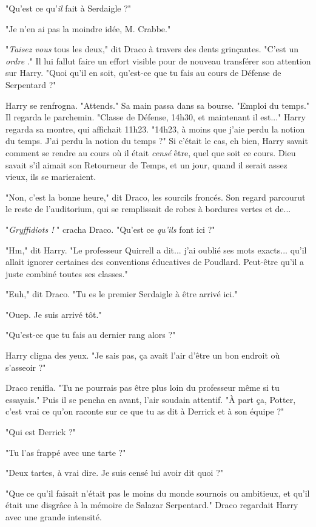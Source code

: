 "Qu'est ce qu'\emph{il}  fait à Serdaigle ?"

"Je n'en ai pas la moindre idée, M. Crabbe."

"\emph{Taisez vous}  tous les deux," dit Draco à travers des dents grinçantes. "C'est un \emph{ordre} ." Il lui fallut faire un effort visible pour de nouveau transférer son attention sur Harry. "Quoi qu'il en soit, qu'est-ce que tu fais au cours de Défense de Serpentard ?"

Harry se renfrogna. "Attends." Sa main passa dans sa bourse. "Emploi du temps." Il regarda le parchemin. "Classe de Défense, 14h30, et maintenant il est..." Harry regarda sa montre, qui affichait 11h23. "14h23, à moins que j'aie perdu la notion du temps. J'ai perdu la notion du temps ?" Si c'était le cas, eh bien, Harry savait comment se rendre au cours où il était \emph{censé } être, quel que soit ce cours. Dieu savait s'il aimait son Retourneur de Temps, et un jour, quand il serait assez vieux, ils se marieraient.

"Non, c'est la bonne heure," dit Draco, les sourcils froncés. Son regard parcourut le reste de l'auditorium, qui se remplissait de robes à bordures vertes et de...

"\emph{Gryffidiots !} " cracha Draco. "Qu'est ce \emph{qu'ils}  font ici ?"

"Hm," dit Harry. "Le professeur Quirrell a dit... j'ai oublié ses mots exacts... qu'il allait ignorer certaines des conventions éducatives de Poudlard. Peut-être qu'il a juste combiné toutes ses classes."

"Euh," dit Draco. "Tu es le premier Serdaigle à être arrivé ici."

"Ouep. Je suis arrivé tôt."

"Qu'est-ce que tu fais au dernier rang alors ?"

Harry cligna des yeux. "Je sais pas, ça avait l'air d'être un bon endroit où s'asseoir ?"

Draco renifla. "Tu ne pourrais pas être plus loin du professeur même si tu essayais." Puis il se pencha en avant, l'air soudain attentif. "À part ça, Potter, c'est vrai ce qu'on raconte sur ce que tu as dit à Derrick et à son équipe ?"

"Qui est Derrick ?"

"Tu l'as frappé avec une tarte ?"

"Deux tartes, à vrai dire. Je suis censé lui avoir dit quoi ?"

"Que ce qu'il faisait n'était pas le moins du monde sournois ou ambitieux, et qu'il était une disgrâce à la mémoire de Salazar Serpentard." Draco regardait Harry avec une grande intensité.

